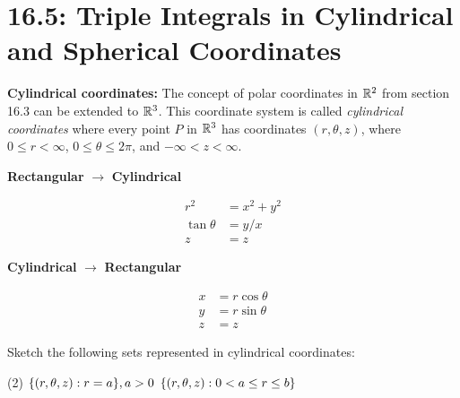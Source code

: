 \documentclass[mathNotesPreamble]{subfiles}
\begin{document}
\section{16.5: Triple Integrals in Cylindrical and Spherical Coordinates}

  \textbf{Cylindrical coordinates:}\newline
  The concept of polar coordinates in $\mathbb{R}^2$ from section 16.3 can be extended to $\mathbb{R}^3$. This coordinate system is called \textit{cylindrical coordinates} where every point $P$ in $\mathbb{R}^3$ has coordinates $(r,\theta, z)$, where $0\leq r<\infty$, $0\leq\theta\leq 2\pi$, and $-\infty<z<\infty$.

  \begin{thmBox*}
    \vspace*{0.5\baselineskip}
    \begin{minipage}{0.5\linewidth}
      \begin{center}
        \textbf{Rectangular} $\rightarrow$ \textbf{Cylindrical}
      \end{center}
      \begin{align*}
        r^2&=x^2+y^2\\
        \tan\theta&=y/x\\
        z&=z
      \end{align*}
    \end{minipage}%
    \begin{minipage}{0.5\linewidth}
      \begin{center}
        \textbf{Cylindrical} $\rightarrow$ \textbf{Rectangular}
      \end{center}
      \begin{align*}
        x&=r\cos\theta\\
        y&=r\sin\theta\\
        z&=z
      \end{align*}
    \end{minipage}%
  \end{thmBox*}

  \begin{ex*}
    Sketch the following sets represented in cylindrical coordinates:
  \end{ex*}
  \begin{tasks}[after-item-skip=\stretch{1}, label=](2)
    \task ${\left\{(r,\theta,z): r=a\right\}}, a>0$
    \task ${\left\{(r,\theta,z): 0<a\leq r\leq b\right\}}$
  \end{tasks}
  \pagebreak
  
\end{document}
